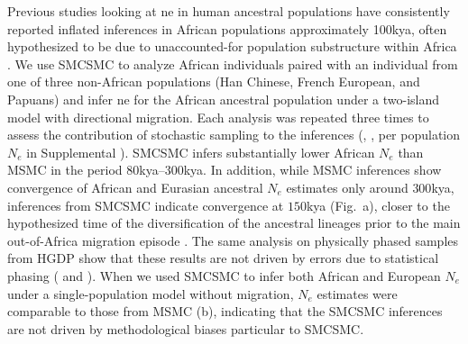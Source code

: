 Previous studies looking at \gls{ne} in human ancestral populations have consistently reported inflated inferences in African populations approximately 100kya, often hypothesized to be due to unaccounted-for population substructure within Africa \cite{Li2011,Schiffels2014}. We use SMCSMC to analyze African individuals paired with an individual from one of three non-African populations (Han Chinese, French European, and Papuans) and infer \gls{ne} for the African ancestral population under a two-island model with directional migration.  Each analysis was repeated three times to assess the contribution of stochastic sampling to the inferences (, , per population $N_e$ in Supplemental ). SMCSMC infers substantially lower African $N_e$ than MSMC in the period $80$kya--$300$kya.  In addition, while MSMC inferences show convergence of African and Eurasian ancestral $N_e$ estimates only around $300$kya, inferences from SMCSMC indicate convergence at $150$kya (Fig.\ a), closer to the hypothesized time of the diversification of the ancestral lineages prior to the main out-of-Africa migration episode \cite{Timmermann2016, Malaspinas2016}. The same analysis on physically phased samples from HGDP show that these results are not driven by errors due to statistical phasing ( and ). When we used SMCSMC to infer both African and European $N_e$ under a single-population model without migration, $N_e$ estimates were comparable to those from MSMC (b), indicating that the SMCSMC inferences are not driven by methodological biases particular to SMCSMC.

